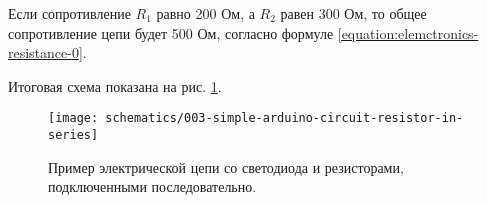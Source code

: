 \documentclass[../sparc.tex]{subfiles}
\begin{document}
Если сопротивление $R_1$ равно 200 Ом, а $R_2$ равен 300 Ом, то общее
сопротивление цепи будет 500 Ом, согласно формуле
\ref{equation:elemctronics-resistance-0}.

Итоговая схема показана на рис.
\ref{fig:breadboard-simple-arduino-circuit-resistor-in-series}.

\begin{figure}[ht]
  \centering
  \texttt{[image: schematics/003-simple-arduino-circuit-resistor-in-series]}
  \caption{Пример электрической цепи со светодиода и резисторами, подключенными
    последовательно.}
  \label{fig:breadboard-simple-arduino-circuit-resistor-in-series}
\end{figure}
\end{document}
